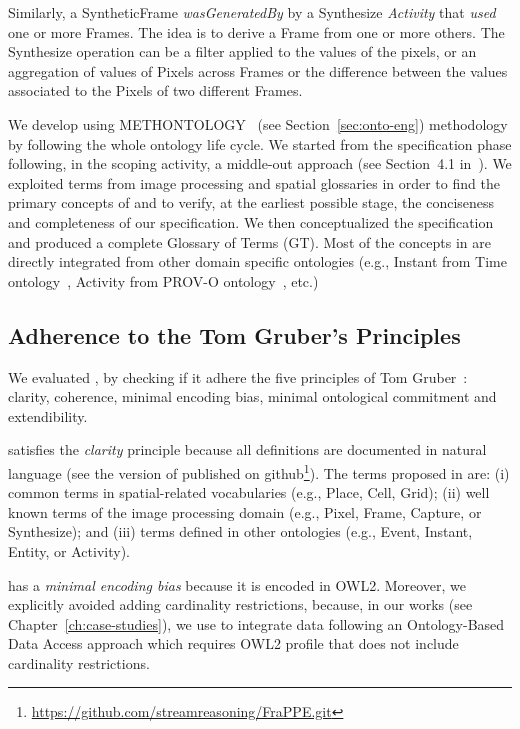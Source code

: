 Similarly, a \textsf{SyntheticFrame} \textit{wasGeneratedBy} by a \textsf{Synthesize} \textit{Activity} that \textit{used} one or more \textsf{Frame}s. The idea is to derive a \textsf{Frame} from one or more others. The \textsf{Synthesize} operation can be a filter applied to the values of the pixels, or an aggregation of values of \textsf{Pixel}s across \textsf{Frame}s or the difference between the values associated to the \textsf{Pixel}s of two different \textsf{Frame}s. 

We develop \frappe{} using METHONTOLOGY~\cite{fernandez1997methontology} (see Section~\ref{sec:onto-eng}) methodology by following the whole ontology life cycle.
We started from the specification phase following, in the scoping activity, a middle-out approach (see Section~4.1 in~\cite{fernandez1997methontology}). We exploited terms from image processing and spatial glossaries in order to find the primary concepts of \frappe{} and to verify, at the earliest possible stage, the conciseness and completeness of our specification. 
We then conceptualized the specification and produced a complete  Glossary of Terms (GT).
Most of the concepts in \frappe{} are directly integrated from other domain specific ontologies (e.g., Instant from Time ontology~\cite{Hobbs2006}, Activity from PROV-O ontology~\cite{w3c-prov-o}, etc.)

\subsection{Adherence to the Tom Gruber's Principles} \label{sec:conc-fr-1-eval}
We evaluated \frappe{}, by checking if it adhere the five principles of Tom Gruber~\cite{DBLP:journals/ijmms/Gruber95}: 
clarity, coherence, minimal encoding bias, minimal ontological commitment and extendibility.

\frappe{} satisfies the \textit{clarity} principle because all definitions are documented in natural language (see the version of \frappe{} published on github\footnote{\url{https://github.com/streamreasoning/FraPPE.git}}). The terms proposed in \frappe{} are: (i) common terms in spatial-related vocabularies (e.g., \textsf{Place}, \textsf{Cell}, \textsf{Grid}); (ii) well known terms of the image processing domain (e.g., \textsf{Pixel}, \textsf{Frame}, \textsf{Capture}, or \textsf{Synthesize}); and (iii) terms defined in other ontologies (e.g., Event, Instant, Entity, or Activity). 

\frappe{} has a \textit{minimal encoding bias} because it is encoded in OWL2. Moreover, we explicitly avoided adding cardinality restrictions, because, in our works (see Chapter~\ref{ch:case-studies}), we use \frappe{} to integrate data following an Ontology-Based Data Access approach which requires OWL2 profile that does not include cardinality restrictions.   

